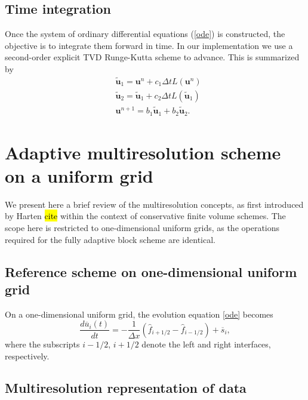 \documentclass[]{article}
\begin{document}
    \subsection{Time integration}

        Once the system of ordinary differential equations (\ref{ode}) is
        constructed, the objective is to integrate them forward in time. In our
        implementation we use a second-order explicit TVD Runge-Kutta scheme to
        advance. This is summarized by
        \begin{align}
            & \tilde{\bm{u}}_{1} = \bm{u}^{n} + c_{1} \Delta t L(\bm{u}^{n}) \\
            & \tilde{\bm{u}}_{2} = \tilde{\bm{u}}_{1} + c_{2} \Delta t L(\tilde{\bm{u}}_{1}) \\
            & \bm{u}^{n+1} = b_{1} \tilde{\bm{u}}_{1} + b_{2} \tilde{\bm{u}}_{2}.
        \end{align}

\section{Adaptive multiresolution scheme on a uniform grid}

    We present here a brief review of the multiresolution concepts, as first
    introduced by Harten \hl{cite} within the context of conservative finite
    volume schemes. The scope here is restricted to one-dimensional uniform
    grids, as the operations required for the fully adaptive block scheme are
    identical.

    \subsection{Reference scheme on one-dimensional uniform grid}

    On a one-dimensional uniform grid, the evolution equation \ref{ode} becomes
    \begin{equation}
        \frac{d \overline{u}_{i}(t)}{dt} = -\frac{1}{\Delta x} \left( \hat{f}_{i+1/2} -
        \hat{f}_{i-1/2} \right) + \overline{s}_{i},
        \label{ode}
    \end{equation}
    where the subscripts $i-1/2$, $i+1/2$ denote the left and right interfaces, respectively.

    \subsection{Multiresolution representation of data}
\end{document}
